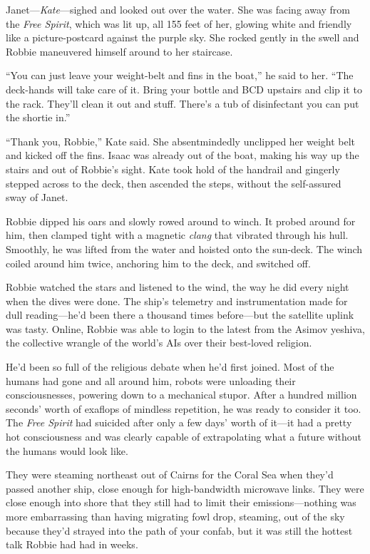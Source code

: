 Janet—\emph{Kate}—sighed and looked out over the water. She was
facing away from the \emph{Free Spirit}, which was lit up, all 155
feet of her, glowing white and friendly like a picture-postcard
against the purple sky. She rocked gently in the swell and Robbie
maneuvered himself around to her staircase.

“You can just leave your weight-belt and fins in the boat,” he said
to her. “The deck-hands will take care of it. Bring your bottle and
BCD upstairs and clip it to the rack. They’ll clean it out and
stuff. There’s a tub of disinfectant you can put the shortie in.”

“Thank you, Robbie,” Kate said. She absentmindedly unclipped her
weight belt and kicked off the fins. Isaac was already out of the
boat, making his way up the stairs and out of Robbie’s sight. Kate
took hold of the handrail and gingerly stepped across to the deck,
then ascended the steps, without the self-assured sway of Janet.

Robbie dipped his oars and slowly rowed around to winch. It probed
around for him, then clamped tight with a magnetic \emph{clang}
that vibrated through his hull. Smoothly, he was lifted from the
water and hoisted onto the sun-deck. The winch coiled around him
twice, anchoring him to the deck, and switched off.

Robbie watched the stars and listened to the wind, the way he did
every night when the dives were done. The ship’s telemetry and
instrumentation made for dull reading—he’d been there a thousand
times before—but the satellite uplink was tasty. Online, Robbie was
able to login to the latest from the Asimov yeshiva, the collective
wrangle of the world’s AIs over their best-loved religion.

He’d been so full of the religious debate when he’d first joined.
Most of the humans had gone and all around him, robots were
unloading their consciousnesses, powering down to a mechanical
stupor. After a hundred million seconds’ worth of exaflops of
mindless repetition, he was ready to consider it too. The
\emph{Free Spirit} had suicided after only a few days’ worth of
it—it had a pretty hot consciousness and was clearly capable of
extrapolating what a future without the humans would look like.

They were steaming northeast out of Cairns for the Coral Sea when
they’d passed another ship, close enough for high-bandwidth
microwave links. They were close enough into shore that they still
had to limit their emissions—nothing was more embarrassing than
having migrating fowl drop, steaming, out of the sky because they’d
strayed into the path of your confab, but it was still the hottest
talk Robbie had had in weeks.

